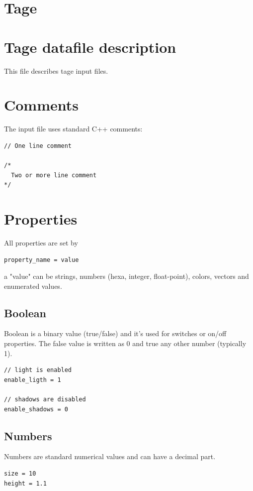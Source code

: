\documentclass[9pt]{article}
\begin{document}
\section{Tage}

\section{Tage datafile description}

This file describes tage input files.

\section{Comments}

The input file uses standard C++ comments:
\begin{verbatim}
// One line comment

/*
  Two or more line comment
*/
\end{verbatim}

\section{Properties}

All properties are set by
\begin{verbatim}
property_name = value
\end{verbatim}
a "value" can be strings, numbers (hexa, integer, float-point), colors, vectors
and enumerated values.

\subsection{Boolean}

Boolean is a binary value (true/false) and it's used for switches
or on/off properties. The false value is written as 0 and true any other
number (typically 1).
\begin{verbatim}
// light is enabled 
enable_ligth = 1

// shadows are disabled
enable_shadows = 0
\end{verbatim}

\subsection{Numbers}

Numbers are standard numerical values and can have a decimal part.
\begin{verbatim}
size = 10
height = 1.1
\end{verbatim}
\end{document}
